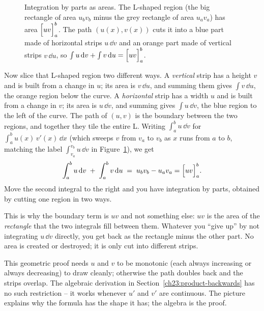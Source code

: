 \begin{figure}[H]
\caption{Integration by parts as areas. The L-shaped region (the big rectangle of area $u_b v_b$ minus the grey rectangle of area $u_a v_a$) has area $\Big[uv\Big]_{a}^b$. The path $(u(x),v(x))$ cuts it into a blue part made of horizontal strips $u\,\dd v$ and an orange part made of vertical strips $v\,\dd u$, so $\int u\,\mathrm{d} v + \int v\,\mathrm{d} u = \Big[uv\Big]_{a}^b$.}
\label{ch23:fig-rectangle}
\end{figure}

Now slice that L-shaped region two different ways. A \emph{vertical} strip has a
height $v$ and is built from a change in $u$; its area is $v\,\dd u$, and summing
them gives $\int v\,\dd u$, the orange region below the curve. A \emph{horizontal}
strip has a width $u$ and is built from a change in $v$; its area is $u\,\dd v$,
and summing gives $\int u\,\dd v$, the blue region to the left of the curve. The
path of $(u,v)$ is the boundary between the two regions, and together they tile
the entire L. Writing $\int_a^b u\,\dd v$ for $\int_a^b u(x)\,v'(x)\,\dd x$ (which
sweeps $v$ from $v_a$ to $v_b$ as $x$ runs from $a$ to $b$, matching the label
$\int_{v_a}^{v_b} u\,\dd v$ in Figure~\ref{ch23:fig-rectangle}), we get
\[
\int_a^b u\,\mathrm{d} v \;+\; \int_a^b v\,\mathrm{d} u \;=\; u_b v_b - u_a v_a
= \Big[uv\Big]_{a}^{b}.
\]
Move the second integral to the right and you have integration by parts, obtained
by cutting one region in two ways.

\begin{intuitionbox}
This is why the boundary term is $uv$ and not something else: $uv$ is the area
of the \emph{rectangle} that the two integrals fill between them. Whatever you
``give up'' by not integrating $u\,\dd v$ directly, you get back as the rectangle
minus the other part. No area is created or destroyed; it is only cut into
different strips.
\end{intuitionbox}

This geometric proof needs $u$ and $v$ to be monotonic (each always increasing
or always decreasing) to draw cleanly; otherwise the path doubles back and the
strips overlap. The
algebraic derivation in Section~\ref{ch23:product-backwards} has no such
restriction -- it works whenever $u'$ and $v'$ are continuous. The picture explains why
the formula has the shape it has; the algebra is the proof.

